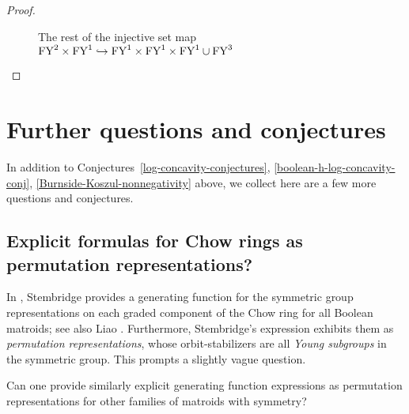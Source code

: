 \begin{proof}
\begin{figure}[ht]
    \caption{The rest of the injective set map $\mathrm{FY}^2\times \mathrm{FY}^1\hookrightarrow \mathrm{FY}^1\times \mathrm{FY}^1\times \mathrm{FY}^1 \cup \mathrm{FY}^3$}
    \label{fig: 3x3b}
\end{figure}
\end{proof}


\section{Further questions and conjectures}
\label{sec: further-questions}
In addition to Conjectures~\ref{log-concavity-conjectures}, \ref{boolean-h-log-concavity-conj}, \ref{Burnside-Koszul-nonnegativity} above,
we collect here are a few more questions and conjectures.

 
\subsection{Explicit formulas for Chow rings as permutation representations?}
In \cite[Lem. 3.1]{Stembridge}, Stembridge provides a generating function for the symmetric group
representations on each graded component of the Chow ring for all Boolean matroids; see also Liao \cite{Liao, Liao_new}.  Furthermore, Stembridge's expression exhibits them as {\it permutation representations}, whose orbit-stabilizers are all {\it Young subgroups} in the symmetric group.
This prompts a slightly vague question.
\begin{question}
Can one provide similarly explicit generating function expressions as permutation representations for other families of
matroids with symmetry?
\end{question}


